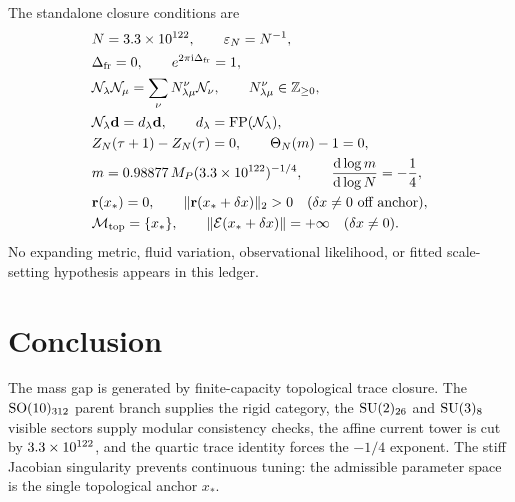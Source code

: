 \documentclass[11pt]{article}
\newcommand{\SO}{\mathrm{SO}}
\newcommand{\SU}{\mathrm{SU}}
\newcommand{\FP}{\operatorname{FP}}
\newcommand{\dd}{\mathrm{d}}
\newcommand{\ii}{\mathrm{i}}
\newcommand{\fusion}{\mathcal{N}}
\newcommand{\Eclosure}{\mathcal{E}}
\begin{document}
The standalone closure conditions are
\begin{equation}
\begin{aligned}
  &N=\modularHorizonBits,\qquad \varepsilon_N=N^{-1},\\
  &\Delta_{\mathrm{fr}}=0,
    \qquad e^{2\pi\ii\Delta_{\mathrm{fr}}}=1,\\
  &\fusion_\lambda\fusion_\mu=\sum_\nu N_{\lambda\mu}^{\nu}\fusion_\nu,
    \qquad N_{\lambda\mu}^{\nu}\in\mathbb{Z}_{\ge0},\\
  &\fusion_\lambda\mathbf{d}=d_\lambda\mathbf{d},
    \qquad d_\lambda=\FP(\fusion_\lambda),\\
  &Z_N(\tau+1)-Z_N(\tau)=0,
    \qquad \Theta_N(m)-1=0,\\
  &m=\simplexPrefactor\,M_P(\modularHorizonBits)^{-1/4},
    \qquad \frac{\dd\log m}{\dd\log N}=-\frac14,\\
  &\mathbf{r}(x_*)=0,
    \qquad \|\mathbf{r}(x_*+\delta x)\|_2>0\quad(\delta x\neq0\ \text{off anchor}),\\
  &\mathcal{M}_{\mathrm{top}}=\{x_*\},
    \qquad \|\Eclosure(x_*+\delta x)\|=+\infty\quad(\delta x\neq0).
\end{aligned}
\label{eq:closure-ledger}
\end{equation}
No expanding metric, fluid variation, observational likelihood, or fitted scale-setting hypothesis appears in this ledger.

\section{Conclusion}

The mass gap is generated by finite-capacity topological trace closure.  The \(\SO(10)_{\benchmarkParentLevel}\) parent branch supplies the rigid category, the \(\SU(2)_{\benchmarkLeptonLevel}\) and \(\SU(3)_{\benchmarkQuarkLevel}\) visible sectors supply modular consistency checks, the affine current tower is cut by \(3.3\times10^{122}\), and the quartic trace identity forces the \(-1/4\) exponent.  The stiff Jacobian singularity prevents continuous tuning: the admissible parameter space is the single topological anchor \(x_*\).
\end{document}
